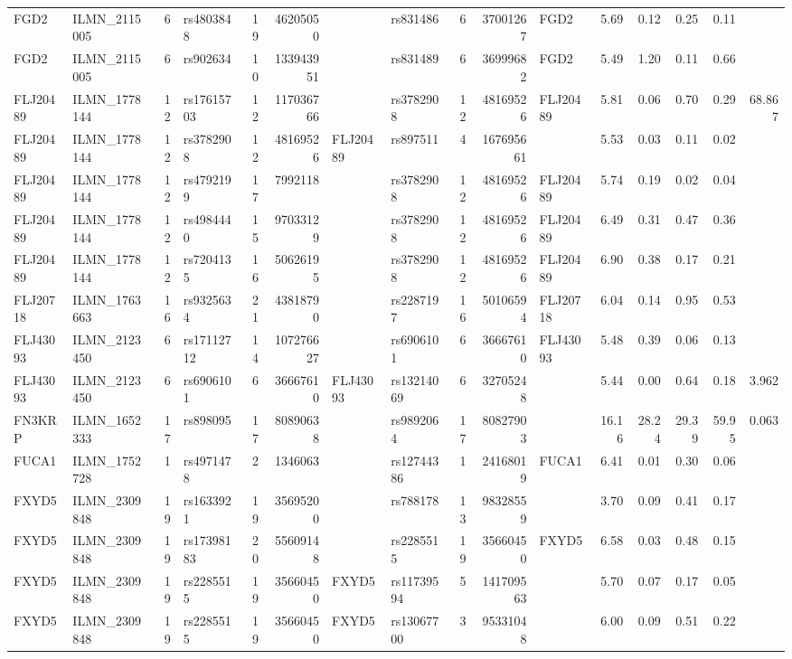\documentclass{article}
\begin{document}
\begin{landscape}
{\begin{ThreePartTable}
\begin{longtable}{|llr|lrrl|lrrl|rrrr|r|}
  FGD2 & ILMN\_2115005 & 6 & rs4803848 & 19 & 46205050 &  & rs831486 & 6 & 37001267 & FGD2 & 5.69 & 0.12 & 0.25 & 0.11 &  \\
  FGD2 & ILMN\_2115005 & 6 & rs902634 & 10 & 133943951 &  & rs831489 & 6 & 36999682 & FGD2 & 5.49 & 1.20 & 0.11 & 0.66 &  \\
  FLJ20489 & ILMN\_1778144 & 12 & rs17615703 & 12 & 117036766 &  & rs3782908 & 12 & 48169526 & FLJ20489 & 5.81 & 0.06 & 0.70 & 0.29 & 68.867 \\
  FLJ20489 & ILMN\_1778144 & 12 & rs3782908 & 12 & 48169526 & FLJ20489 & rs897511 & 4 & 167695661 &  & 5.53 & 0.03 & 0.11 & 0.02 &  \\
  FLJ20489 & ILMN\_1778144 & 12 & rs4792199 & 17 & 7992118 &  & rs3782908 & 12 & 48169526 & FLJ20489 & 5.74 & 0.19 & 0.02 & 0.04 &  \\
  FLJ20489 & ILMN\_1778144 & 12 & rs4984440 & 15 & 97033129 &  & rs3782908 & 12 & 48169526 & FLJ20489 & 6.49 & 0.31 & 0.47 & 0.36 &  \\
  FLJ20489 & ILMN\_1778144 & 12 & rs7204135 & 16 & 50626195 &  & rs3782908 & 12 & 48169526 & FLJ20489 & 6.90 & 0.38 & 0.17 & 0.21 &  \\
  FLJ20718 & ILMN\_1763663 & 16 & rs9325634 & 21 & 43818790 &  & rs2287197 & 16 & 50106594 & FLJ20718 & 6.04 & 0.14 & 0.95 & 0.53 &  \\
  FLJ43093 & ILMN\_2123450 & 6 & rs17112712 & 14 & 107276627 &  & rs6906101 & 6 & 36667610 & FLJ43093 & 5.48 & 0.39 & 0.06 & 0.13 &  \\
  FLJ43093 & ILMN\_2123450 & 6 & rs6906101 & 6 & 36667610 & FLJ43093 & rs13214069 & 6 & 32705248 &  & 5.44 & 0.00 & 0.64 & 0.18 & 3.962 \\
  FN3KRP & ILMN\_1652333 & 17 & rs898095 & 17 & 80890638 &  & rs9892064 & 17 & 80827903 &  & 16.16 & 28.24 & 29.39 & 59.95 & 0.063 \\
  FUCA1 & ILMN\_1752728 & 1 & rs4971478 & 2 & 1346063 &  & rs12744386 & 1 & 24168019 & FUCA1 & 6.41 & 0.01 & 0.30 & 0.06 &  \\
  FXYD5 & ILMN\_2309848 & 19 & rs1633921 & 19 & 35695200 &  & rs788178 & 13 & 98328559 &  & 3.70 & 0.09 & 0.41 & 0.17 &  \\
  FXYD5 & ILMN\_2309848 & 19 & rs17398183 & 20 & 55609148 &  & rs2285515 & 19 & 35660450 & FXYD5 & 6.58 & 0.03 & 0.48 & 0.15 &  \\
  FXYD5 & ILMN\_2309848 & 19 & rs2285515 & 19 & 35660450 & FXYD5 & rs11739594 & 5 & 141709563 &  & 5.70 & 0.07 & 0.17 & 0.05 &  \\
  FXYD5 & ILMN\_2309848 & 19 & rs2285515 & 19 & 35660450 & FXYD5 & rs13067700 & 3 & 95331048 &  & 6.00 & 0.09 & 0.51 & 0.22 &  \\

\end{longtable}
\end{ThreePartTable}}
\end{landscape}
\end{document}
